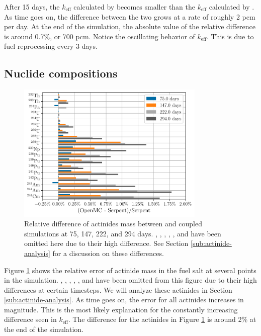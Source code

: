 After 15 days, the $k_\text{eff}$ calculated by \OpenMC becomes smaller than
the $k_\text{eff}$ calculated by \SerpentTWO. As time goes on, the difference
between the two grows at a rate of roughly 2 pcm per day. At the end of the simulation, the absolute
value of the relative difference is around 0.7\%, or 700 pcm. Notice the
oscillating behavior of $k_\text{eff}$. This is due to fuel reprocessing every 3 days.


\subsection{Nuclide compositions}
\label{sub:nuclide-compositions}

\begin{figure}[htpb]
    \centering
    \includegraphics[width=0.8\textwidth]{figs/ch5/actinides.pdf}
    \caption[Relative difference of actinides mass in fuel at selected time steps]{Relative difference of actinides mass between \OpenMC and \SerpentTWO
    coupled simulations at 75, 147, 222, and 294 days. , ,
    , ,
    , and  have been omitted here due to their high difference.
    See Section \ref{sub:actinide-analysis} for a discussion on these differences.}
    \label{fig:actinides}
\end{figure}

Figure \ref{fig:actinides} shows the relative error of actinide mass in the fuel
salt at several points in the simulation. , ,
, , , and  have been omitted
from this figure due to their high differences at certain timesteps. We will analyze these
actinides in Section \ref{sub:actinide-analysis}. As time goes on, the error for
all actinides increases in magnitude. This is the most likely explanation for the constantly
increasing difference seen in $k_\text{eff}$. The difference for the actinides in
Figure \ref{fig:actinides} is around 2\% at the end of the simulation.

